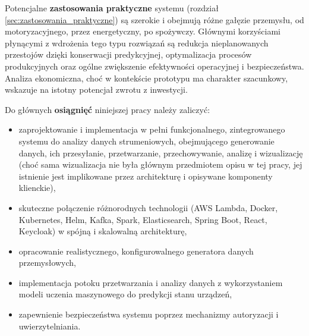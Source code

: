 Potencjalne \textbf{zastosowania praktyczne} systemu (rozdział \ref{sec:zastosowania_praktyczne}) są szerokie i obejmują różne gałęzie przemysłu, od motoryzacyjnego, przez energetyczny, po spożywczy. Głównymi korzyściami płynącymi z wdrożenia tego typu rozwiązań są redukcja nieplanowanych przestojów dzięki konserwacji predykcyjnej, optymalizacja procesów produkcyjnych oraz ogólne zwiększenie efektywności operacyjnej i bezpieczeństwa. Analiza ekonomiczna, choć w kontekście prototypu ma charakter szacunkowy, wskazuje na istotny potencjał zwrotu z inwestycji.

Do głównych \textbf{osiągnięć} niniejszej pracy należy zaliczyć:
\begin{itemize}
    \item zaprojektowanie i implementacja w pełni funkcjonalnego, zintegrowanego systemu do analizy danych  strumeniowych, obejmującego generowanie danych, ich przesyłanie, przetwarzanie, przechowywanie, analizę i wizualizację (choć sama wizualizacja nie była głównym przedmiotem opisu w tej pracy, jej istnienie jest implikowane przez architekturę i opisywane komponenty klienckie),
    \item skuteczne połączenie różnorodnych technologii (AWS Lambda, Docker, Kubernetes, Helm, Kafka, Spark, Elasticsearch, Spring Boot, React, Keycloak) w spójną i skalowalną architekturę,
    \item opracowanie realistycznego, konfigurowalnego generatora danych przemysłowych,
    \item implementacja potoku przetwarzania i analizy danych z wykorzystaniem modeli uczenia maszynowego do predykcji stanu urządzeń,
    \item zapewnienie bezpieczeństwa systemu poprzez mechanizmy autoryzacji i uwierzytelniania.
\end{itemize}

